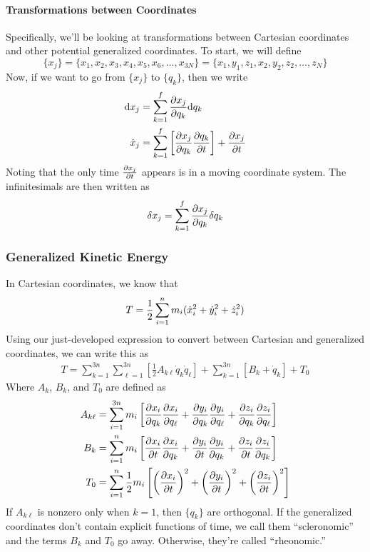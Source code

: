 \documentclass[a4paper]{article}
\begin{document}
\paragraph{Transformations between Coordinates}
Specifically, we'll be looking at transformations between Cartesian coordinates
and other potential generalized coordinates. To start, we will define
\[
	\{x_j\} = \{x_1,x_2,x_3,x_4,x_5,x_6,\ldots,x_{3N}\}
	= \{x_1,y_1,z_1,x_2,y_2,z_2,\ldots,z_N\}
\]
Now, if we want to go from $\{x_j\}$ to $\{q_k\}$, then we write
\begin{align*}
	\mathrm{d} x_j &= \sum_{k=1}^{f}\frac{\partial x_j}{\partial q_k}\mathrm{d} q_k\\
		\dot{x}_j&=
		\sum_{k=1}^{f}\left[\frac{\partial x_j}{\partial q_k}\frac{\partial q_k}{\partial t}\right]
			+ \frac{\partial x_j}{\partial t}
\end{align*}
Noting that the only time $\frac{\partial x_j}{\partial t}$ appears is in a moving coordinate
system.
The infinitesimals are then written as
\[
	\delta x_j = \sum_{k=1}^{f}\frac{\partial x_j}{\partial q_k}\delta q_k
\]

\subsubsection{Generalized Kinetic Energy}
In Cartesian coordinates, we know that
\[
	T = \frac{1}{2}\sum_{i=1}^{n}m_i(\dot{x}_i^2+\dot{y}_i^2+\dot{z}_i^2)\\
\]
Using our just-developed expression to convert between Cartesian and
generalized coordinates, we can write this as
\begin{align*}
	T =
	\sum_{k=1}^{3n}\sum_{\ell=1}^{3n}
		\left[\frac{1}{2}A_{k\ell}\dot{q}_k\dot{q}_\ell\right]
	+ \sum_{k=1}^{3n}[B_k + \dot{q}_k] + T_0
\end{align*}
Where $A_k$, $B_k$, and $T_0$ are defined as
\begin{align*}
	A_{k\ell} &= \sum_{i=1}^{3n}m_i
		\left[\frac{\partial x_i}{\partial q_k}\frac{\partial x_i}{\partial q_\ell}
		+\frac{\partial y_i}{\partial q_k}\frac{\partial y_i}{\partial q_\ell}
		+\frac{\partial z_i}{\partial q_k}\frac{\partial z_i}{\partial q_\ell}\right]\\
	B_{k} &=\sum_{i=1}^{n}m_i
		\left[\frac{\partial x_i}{\partial t}\frac{\partial x_i}{\partial q_k}
		+\frac{\partial y_i}{\partial t}\frac{\partial y_i}{\partial q_k}
		+\frac{\partial z_i}{\partial t}\frac{\partial z_i}{\partial q_k}\right]\\
	T_0 &= \sum_{i=1}^{n}\frac{1}{2}m_i
		\left[\left(\frac{\partial x_i}{\partial t}\right)^2
		+\left(\frac{\partial y_i}{\partial t}\right)^2
		+\left(\frac{\partial z_i}{\partial t}\right)^2\right]
\end{align*}
If $A_{k\ell}$ is nonzero only when $k=1$, then $\{q_k\}$ are orthogonal.
If the generalized coordinates don't contain explicit functions of time, we
call them ``scleronomic'' and the terms $B_k$ and $T_0$ go away. Otherwise,
they're called ``rheonomic.''
\end{document}

